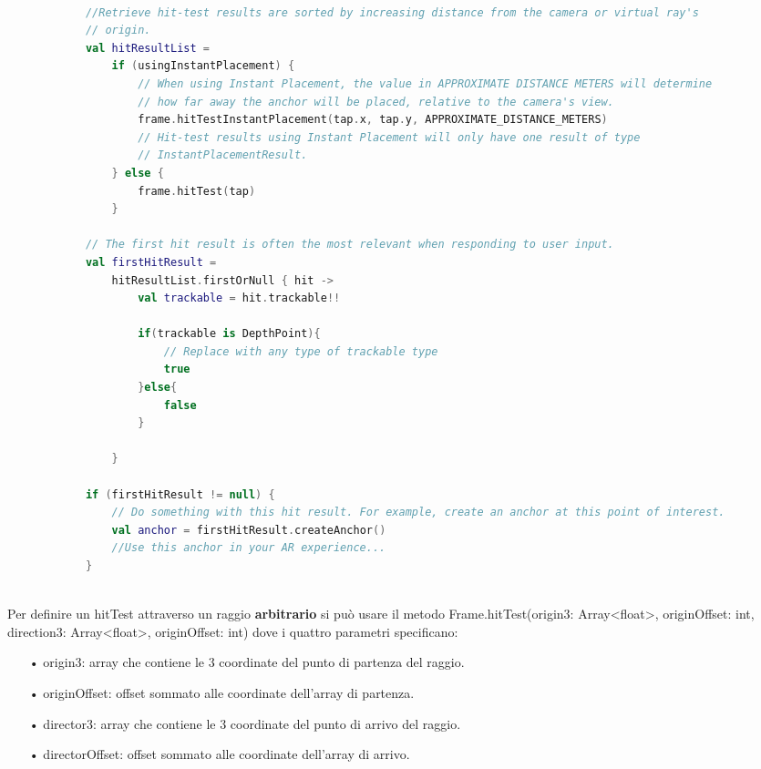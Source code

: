 \documentclass[crop=false, class=book]{standalone}
\begin{document}
	\begin{center}
		\begin{minipage}{1.1\textwidth}
			\begin{lstlisting}[caption={Filtraggio hitTest in base al tipo}, label={lst: hitTest-filter}, language=Kotlin]
			
			//Retrieve hit-test results are sorted by increasing distance from the camera or virtual ray's
			// origin.
			val hitResultList =
  				if (usingInstantPlacement) {
    				// When using Instant Placement, the value in APPROXIMATE DISTANCE METERS will determine
    				// how far away the anchor will be placed, relative to the camera's view.
    				frame.hitTestInstantPlacement(tap.x, tap.y, APPROXIMATE_DISTANCE_METERS)
    				// Hit-test results using Instant Placement will only have one result of type
    				// InstantPlacementResult.
  				} else {
    				frame.hitTest(tap)
  				}
  				
			// The first hit result is often the most relevant when responding to user input.
			val firstHitResult =
  				hitResultList.firstOrNull { hit ->
  					val trackable = hit.trackable!!
  					
  					if(trackable is DepthPoint){
  						// Replace with any type of trackable type
  						true
  					}else{
  						false
  					}

  				}
  				
			if (firstHitResult != null) {
  				// Do something with this hit result. For example, create an anchor at this point of interest.
  				val anchor = firstHitResult.createAnchor()
  				//Use this anchor in your AR experience...
			}
  								
			\end{lstlisting}
		\end{minipage}
	\end{center}
	
	
	Per definire un hitTest attraverso un raggio \textbf{arbitrario} si può usare il metodo Frame.hitTest(origin3: Array<float>, originOffset: int, direction3: Array<float>, originOffset: int) dove i quattro parametri specificano:
	
	\begin{itemize}
		\item[•] origin3: array che contiene le 3 coordinate del punto di partenza del raggio.
		\item[•] originOffset: offset sommato alle coordinate dell'array di partenza.
		\item[•] director3: array che contiene le 3 coordinate del punto di arrivo del raggio.
		\item[•] directorOffset: offset sommato alle coordinate dell'array di arrivo.
	\end{itemize}
	
\end{document}
